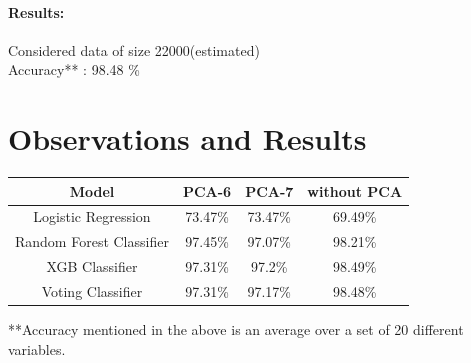 \documentclass{scrreprt}
\begin{document}
\subsubsection{Results:}
	Considered data of size 22000(estimated) \\
	Accuracy** : 98.48 \%


\chapter{Observations and Results}

\begin{center}
 \begin{tabular}{||c | c | c | c||} 
 \hline
 Model & PCA-6 & PCA-7 & without PCA \\ [0.5ex] 
 \hline\hline
 Logistic Regression & 73.47\% & 73.47\% & 69.49\%\\ 
 \hline
 Random Forest Classifier & 97.45\% & 97.07\% & 98.21\%\\
 \hline
 XGB Classifier & 97.31\% & 97.2\% & 98.49\%\\
 \hline
 Voting Classifier & 97.31\% & 97.17\% & 98.48\% \\
 \hline
\end{tabular}
\end{center}
**Accuracy mentioned in the above is an average over a set of 20 different variables.
\end{document}
